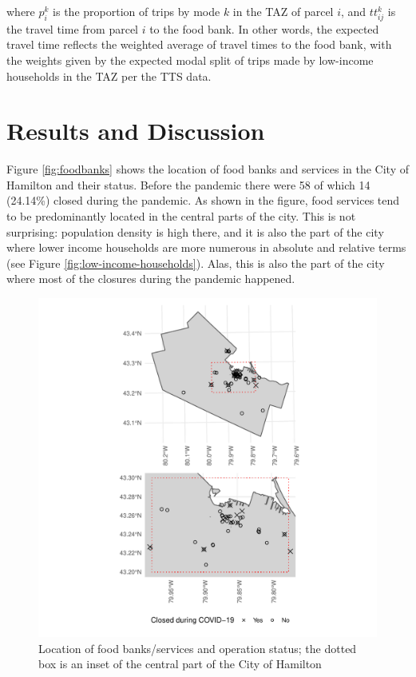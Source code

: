 \documentclass[]{elsarticle} %
\begin{document}
\noindent where \(p^k_i\) is the proportion of trips by mode \(k\) in
the TAZ of parcel \(i\), and \(tt^k_{ij}\) is the travel time from
parcel \(i\) to the food bank. In other words, the expected travel time
reflects the weighted average of travel times to the food bank, with the
weights given by the expected modal split of trips made by low-income
households in the TAZ per the TTS data.

\hypertarget{results-and-discussion}{%
\section{Results and Discussion}\label{results-and-discussion}}

Figure \ref{fig:foodbanks} shows the location of food banks and services
in the City of Hamilton and their status. Before the pandemic there were
58 of which 14 (24.14\%) closed during the pandemic. As shown in the
figure, food services tend to be predominantly located in the central
parts of the city. This is not surprising: population density is high
there, and it is also the part of the city where lower income households
are more numerous in absolute and relative terms (see Figure
\ref{fig:low-income-households}). Alas, this is also the part of the
city where most of the closures during the pandemic happened.

\begin{figure}
\includegraphics[width=1\linewidth]{Accessibility-Foodbanks-Hamilton_files/figure-latex/plot-location-foodbanks-1} \caption{\label{fig:foodbanks}Location of food banks/services and operation status; the dotted box is an inset of the central part of the City of Hamilton}\label{fig:plot-location-foodbanks}
\end{figure}
\end{document}
